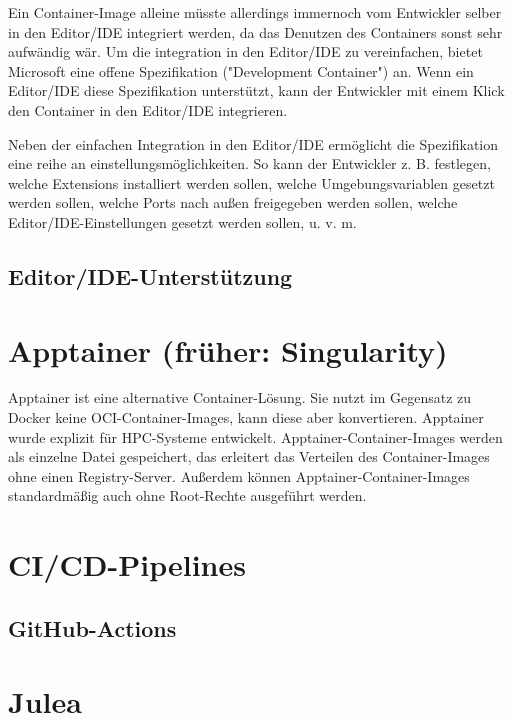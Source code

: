 Ein Container-Image alleine müsste allerdings immernoch vom Entwickler selber in den Editor/IDE integriert werden, da das Denutzen des Containers sonst sehr aufwändig wär. Um die integration in den Editor/IDE zu vereinfachen, bietet Microsoft eine offene Spezifikation ("Development Container") an. Wenn ein Editor/IDE diese Spezifikation unterstützt, kann der Entwickler mit einem Klick den Container in den Editor/IDE integrieren. 

Neben der einfachen Integration in den Editor/IDE ermöglicht die Spezifikation eine reihe an einstellungsmöglichkeiten. So kann der Entwickler z. B. festlegen, welche Extensions installiert werden sollen, welche Umgebungsvariablen gesetzt werden sollen, welche Ports nach außen freigegeben werden sollen, welche Editor/IDE-Einstellungen gesetzt werden sollen, u. v. m.


\subsection{Editor/IDE-Unterstützung}

\section{Apptainer (früher: Singularity)}

Apptainer ist eine alternative Container-Lösung. Sie nutzt im Gegensatz zu Docker keine OCI-Container-Images, kann diese aber konvertieren. Apptainer wurde explizit für HPC-Systeme entwickelt. Apptainer-Container-Images werden als einzelne Datei gespeichert, das erleitert das Verteilen des Container-Images ohne einen Registry-Server. Außerdem können Apptainer-Container-Images standardmäßig auch ohne Root-Rechte ausgeführt werden.


\section{CI/CD-Pipelines}



\subsection{GitHub-Actions}


\section{Julea}

